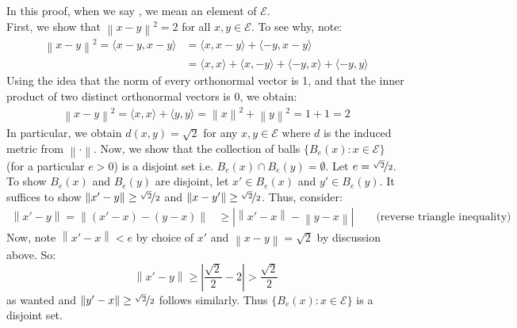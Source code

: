 \documentclass{article}
\newcommand{\norm}[1]{\left\lVert#1\right\rVert}
\begin{document}
    In this proof, when we say , we mean an element of $\mathcal{E}$.\\
    First, we show that $\norm{x-y}^2 = 2$ for all $x,y\in\mathcal{E}$. To see why, note:
    \begin{align*}
        \norm{x-y}^2 = \langle x-y,x-y\rangle &= \langle x,x-y\rangle + \langle -y,x-y\rangle \\
            &= \langle x,x\rangle + \langle x,-y\rangle + \langle -y,x\rangle + \langle -y,y\rangle 
    \end{align*}
    Using the idea that the norm of every orthonormal vector is 1, and that the inner product of two distinct orthonormal vectors
    is 0, we obtain:
    \begin{align*}
        \norm{x-y}^2 = \langle x,x\rangle + \langle y,y\rangle = \norm{x}^2 + \norm{y}^2 = 1 + 1 = 2
    \end{align*}
    In particular, we obtain $d(x,y) = \sqrt{2}$ for any $x,y\in \mathcal{E}$ where $d$ is the induced metric from $\norm{\cdot}$. Now,
    we show that the collection of balls $\{B_e(x): x\in \mathcal{E}\}$ (for a particular $e>0$) is a disjoint set 
    i.e. $B_e(x)\cap B_e(y) = \emptyset$. 
    Let $e = \nicefrac{\sqrt{2}}{2}$. To show $B_e(x)$ and $B_e(y)$ are disjoint, let $x'\in B_e(x)$ and $y'\in B_e(y)$.
    It suffices to show $\norm{x'-y}\geq\nicefrac{\sqrt{2}}{2}$ and $\norm{x-y'}\geq\nicefrac{\sqrt{2}}{2}$. Thus, consider:
    \begin{align*}
        \norm{x'-y} = \norm{(x'-x) - (y-x)} &\geq |\norm{x'-x} - \norm{y-x}|\qquad\text{(reverse triangle inequality)}
    \end{align*}
    Now, note $\norm{x'-x}<e$ by choice of $x'$ and $\norm{x-y}=\sqrt{2}$ by discussion above. So:
    \[ \norm{x'-y} \geq |\frac{\sqrt{2}}{2} - 2| > \frac{\sqrt{2}}{2} \]
    as wanted and $\norm{y'-x}\geq\nicefrac{\sqrt{2}}{2}$ follows similarly. Thus $\{B_e(x): x\in \mathcal{E}\}$ is a disjoint set.\\
\end{document}
